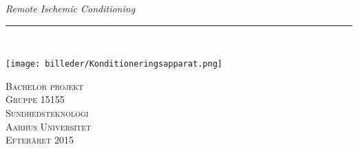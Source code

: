 \thispagestyle{empty}
\begin{flushright}
\vspace{3cm}

\phantom{hul}

\phantom{hul}

\phantom{hul}

\textsl{\Huge Remote Ischemic Conditioning} \\ \vspace{1cm}

\rule{13cm}{3mm} \\ \vspace{1.5cm}
\vspace{1cm}

\texttt{[image: billeder/Konditioneringsapparat.png]}

\vspace{2cm} 
\textsc{\Large Bachelor projekt \\
Gruppe 15155 \\
Sundhedsteknologi \\
Aarhus Universitet \\
Efteråret 2015 \\}
\end{flushright}
